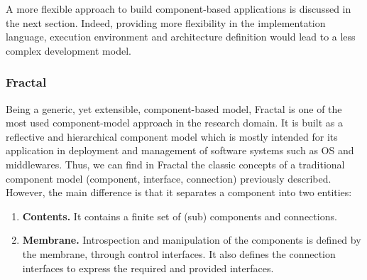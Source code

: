 
A more flexible approach to build component-based applications is discussed in the next section.
Indeed, providing more flexibility in the implementation language, execution environment and architecture definition would lead to a less complex development model.

\subsubsection{Fractal}
Being a generic, yet extensible, component-based model, Fractal\cite{bruneton2006fractal} is one of the most used component-model approach in the research domain.
It is built as a reflective and hierarchical component model which is mostly intended for its application in deployment and management of software systems such as OS and middlewares.
Thus, we can find in Fractal the classic concepts of a traditional component model (component, interface, connection) previously described.
However, the main difference is that it separates a component into two entities:
\begin{enumerate}
	\item \textbf{Contents.} It contains a finite set of (sub) components and connections.
	\item \textbf{Membrane.} Introspection and manipulation of the components is defined by the membrane, through control interfaces.
	It also defines the connection interfaces to express the required and provided interfaces.
\end{enumerate}


